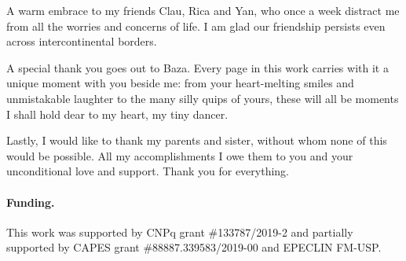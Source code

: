 A warm embrace to my friends Clau, Rica and Yan, who once a week distract me from all the worries
and concerns of life. I am glad our friendship persists even across intercontinental borders.

A special thank you goes out to Baza. Every page in this work carries with it a unique moment with
you beside me: from your heart-melting smiles and unmistakable laughter to the many silly quips of
yours, these will all be moments I shall hold dear to my heart, my tiny dancer.

Lastly, I would like to thank my parents and sister, without whom none of this would be possible.
All my accomplishments I owe them to you and your unconditional love and support. Thank you for
everything.

\paragraph{Funding.} This work was supported by CNPq grant \#133787/2019-2 and partially supported
by CAPES grant \#88887.339583/2019-00 and EPECLIN FM-USP.

\printResumoAbstract



\makeatletter
\if@openright\cleardoublepage\else\clearpage\fi
\makeatother


\newcommand\disablenewpage[1]{{\let\clearpage\par\let\cleardoublepage\par #1}}

